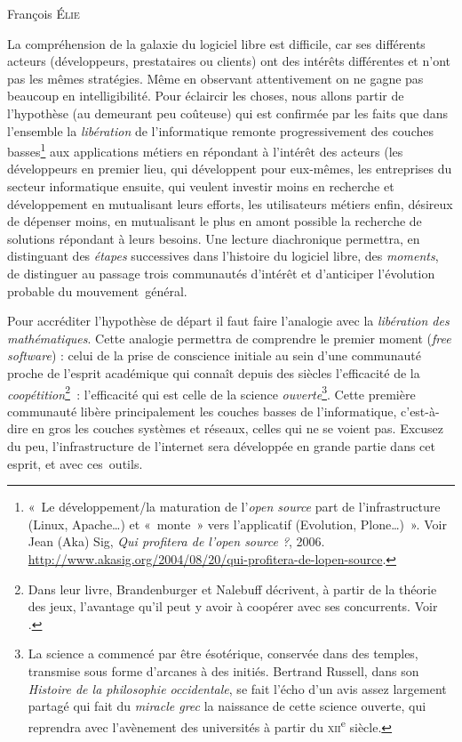 \documentclass{FramateX}
\begin{document}
\begin{refsection}

\begin{flushright}
François \textsc{Élie}
\end{flushright}
\vspace{10 mm}

La compréhension de la galaxie du logiciel libre est difficile, car ses
différents acteurs (développeurs, prestataires ou clients) ont des
intérêts différentes et n'ont pas les mêmes stratégies. Même en
observant attentivement on ne gagne pas beaucoup en intelligibilité.
Pour éclaircir les choses, nous allons partir de l'hypothèse (au
demeurant peu coûteuse) qui est confirmée par les faits que dans
l'ensemble la \textit{libération} de l'informatique remonte
progressivement des couches basses\footnote{«~Le développement/la
maturation de l'\textit{open source} part de l'infrastructure (Linux,
Apache…) et «~monte~» vers l'applicatif (Evolution, Plone…)~». Voir Jean (Aka) Sig,
\textit{Qui profitera de l'open source ?}, 2006. \url{http://www.akasig.org/2004/08/20/qui-profitera-de-lopen-source}.}
aux applications métiers en répondant à l'intérêt des acteurs (les
développeurs en premier lieu, qui développent pour eux-mêmes, les
entreprises du secteur informatique ensuite, qui veulent investir moins
en recherche et développement en mutualisant leurs efforts, les
utilisateurs métiers enfin, désireux de dépenser moins, en mutualisant
le plus en amont possible la recherche de solutions répondant à leurs
besoins. Une lecture diachronique permettra, en distinguant des
\textit{étapes} successives dans l'histoire du logiciel libre, des
\textit{moments}, de distinguer au passage trois communautés d'intérêt
et d'anticiper l'évolution probable du mouvement~général. 

Pour accréditer l'hypothèse de départ il faut faire l'analogie avec la
\textit{libération des mathématiques}. Cette analogie permettra de
comprendre le premier moment (\textit{free software}) : celui de la
prise de conscience initiale au sein d'une communauté proche de
l'esprit académique qui connaît depuis des siècles l'efficacité de la
\textit{coopétition}\footnote{Dans leur livre, Brandenburger et Nalebuff décrivent, à partir de la théorie
des jeux, l'avantage qu'il peut y avoir à coopérer avec ses
concurrents. Voir \cite{Brandenburger1997}.}\textit{~}: l'efficacité qui est celle de la science
\textit{ouverte}\footnote{La science a commencé par être ésotérique,
conservée dans des temples, transmise sous forme d'arcanes à des
initiés. Bertrand Russell, dans son \textit{Histoire de la philosophie
occidentale}, se fait l'écho d'un avis assez largement partagé qui fait
du \textit{miracle grec} la naissance de cette science ouverte, qui
reprendra avec l'avènement des universités à partir du
\textsc{xii}\textsuperscript{e} siècle.}. Cette première communauté
libère principalement les couches basses de l'informatique,
c'est-à-dire en gros les couches systèmes et réseaux, celles qui ne se
voient pas. Excusez du peu, l'infrastructure de l'internet sera
développée en grande partie dans cet esprit, et avec ces~outils. 


\end{refsection}
\end{document}
